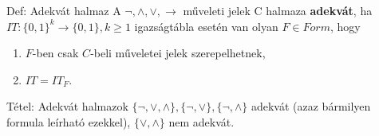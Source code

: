 \documentclass{beamer}
\begin{document}
\begin{frame}

\begin{block}{Def: Adekvát halmaz}
A ${\neg}, {\land}, {\lor}, \rightarrow$ műveleti jelek C halmaza \textbf{adekvát}, ha\\
$IT: \{0, 1\}^k \rightarrow \{0, 1\}, k \geq 1$ igazságtábla esetén van olyan $F \in Form$, hogy\\
\begin{enumerate}
\item $F$-ben csak $C$-beli műveletei jelek szerepelhetnek,
\item $IT = IT_F$.
\end{enumerate} 
\end{block}
\bigskip

\begin{block}{Tétel: Adekvát halmazok}
$\{\neg, \lor, \land\}, \{\neg, \lor\}, \{\neg, \land\}$ adekvát (azaz bármilyen formula leírható ezekkel), $\{\lor, \land\}$ nem adekvát.
\end{block}

\end{frame}
\end{document}
